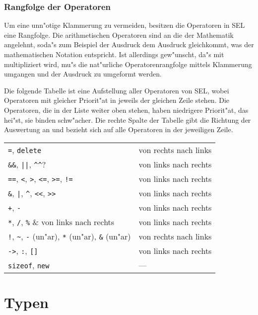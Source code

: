 \subsubsection{Rangfolge der Operatoren}

Um eine unn"otige Klammerung zu vermeiden, besitzen die
Operatoren in SEL eine Rangfolge. Die arithmetischen Operatoren
sind an die der Mathematik angelehnt, soda"s zum Beispiel der
Ausdruck  dem Ausdruck  gleichkommt,
was der mathematischen Notation entspricht. Ist allerdings
gew"unscht, da"s  mit  multipliziert wird, mu"s
die nat"urliche Operatorenrangfolge mittels Klammerung
umgangen und der Ausdruck zu  umgeformt
werden.

Die folgende Tabelle ist eine Aufstellung aller Operatoren von
SEL, wobei Operatoren mit gleicher Priorit"at in jeweils der
gleichen Zeile stehen. Die Operatoren, die in der Liste weiter
oben stehen, haben niedrigere Priorit"at, das hei"st, sie binden
schw"acher. Die rechte Spalte der Tabelle gibt die Richtung
der Auswertung
an und bezieht sich auf alle Operatoren in der jeweiligen Zeile.

\medskip
\begin{tabular}{ll}
\verb?=?, \verb?delete? & von rechts nach links \\
\verb?&&?, \verb?||?, \verb?^^? & von links nach rechts \\
\verb?==?, \verb?<?, \verb?>?, \verb?<=?, \verb?>=?, \verb?!=? &
  von links nach rechts\\
\verb?&?, \verb?|?, \verb?^?, \verb?<<?, \verb?>>? &
  von links nach rechts \\
\verb?+?, \verb?-? & von links nach rechts \\
\verb?*?, \verb?/?, \verb?%? & von links nach rechts \\
\verb?!?, \verb?~?, \verb?-? (un"ar), \verb?*? (un"ar), \verb?&? (un"ar) &
  von rechts nach links \\
\verb?->?, \verb?:?, \verb?[]? & von links nach rechts \\
\verb?sizeof?, \verb?new? & ---
\end{tabular}

\section{Typen}

